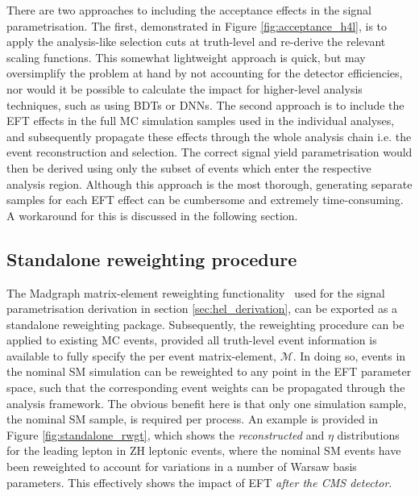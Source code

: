 There are two approaches to including the acceptance effects in the signal parametrisation. The first, demonstrated in Figure \ref{fig:acceptance_h4l}, is to apply the analysis-like selection cuts at truth-level and re-derive the relevant scaling functions. This somewhat lightweight approach is quick, but may oversimplify the problem at hand by not accounting for the detector efficiencies, nor would it be possible to calculate the impact for higher-level analysis techniques, such as using BDTs or DNNs. The second approach is to include the EFT effects in the full MC simulation samples used in the individual analyses, and subsequently propagate these effects through the whole analysis chain i.e. the event reconstruction and selection. The correct signal yield parametrisation would then be derived using only the subset of events which enter the respective analysis region. Although this approach is the most thorough, generating separate samples for each EFT effect can be cumbersome and extremely time-consuming. A workaround for this is discussed in the following section.

\subsection{Standalone reweighting procedure}
The Madgraph matrix-element reweighting functionality~\cite{Mattelaer:2016gcx} used for the signal parametrisation derivation in section \ref{sec:hel_derivation}, can be exported as a standalone reweighting package. Subsequently, the reweighting procedure can be applied to existing MC events, provided all truth-level event information is available to fully specify the per event matrix-element, $\mathcal{M}$. In doing so, events in the nominal SM simulation can be reweighted to any point in the EFT parameter space, such that the corresponding event weights can be propagated through the analysis framework. The obvious benefit here is that only one simulation sample, the nominal SM sample, is required per process. An example is provided in Figure \ref{fig:standalone_rwgt}, which shows the \textit{reconstructed} \pt and $\eta$ distributions for the leading lepton in ZH leptonic events, where the nominal SM events have been reweighted to account for variations in a number of Warsaw basis parameters. This effectively shows the impact of EFT \textit{after the CMS detector}.

